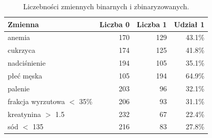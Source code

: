 \begin{table}[htbp]
\centering
\caption{Liczebności zmiennych binarnych i zbinaryzowanych.}
\label{tab:binarne}
\small
\setlength{\tabcolsep}{1.5pt}
\begin{tabular}{lrrr}
\toprule
Zmienna & Liczba 0 & Liczba 1 & Udział 1 \\
\midrule
anemia & 170 & 129 & 43.1\% \\
cukrzyca & 174 & 125 & 41.8\% \\
nadciśnienie & 194 & 105 & 35.1\% \\
płeć męska & 105 & 194 & 64.9\% \\
palenie & 203 & 96 & 32.1\% \\
frakcja wyrzutowa $<$ 35\% & 206 & 93 & 31.1\% \\
kreatynina $>$ 1.5 & 232 & 67 & 22.4\% \\
sód $<$ 135 & 216 & 83 & 27.8\% \\
\bottomrule
\end{tabular}
\end{table}
